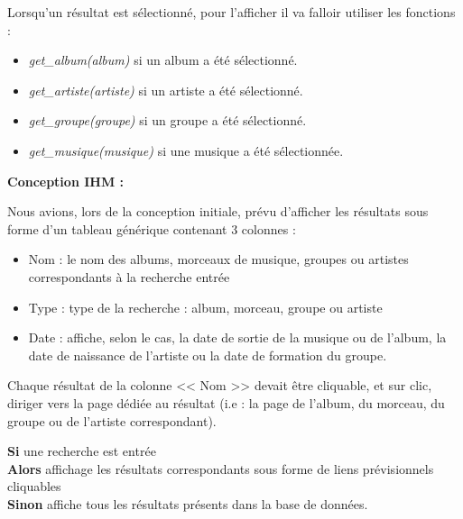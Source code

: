             \begin{paragraphe}
                 Lorsqu'un résultat est sélectionné, pour l'afficher il va falloir utiliser les fonctions :
                \begin{itemize}
                    \item \emph{get\_album(album)} si un album a été sélectionné.
                    \item \emph{get\_artiste(artiste)} si un artiste a été sélectionné.
                    \item \emph{get\_groupe(groupe)} si un groupe a été sélectionné.
                    \item \emph{get\_musique(musique)} si une musique a été sélectionnée.
                \end{itemize}
            \end{paragraphe}

			\begin{paragraphe}
				\textbf{Conception IHM :}
			\end{paragraphe}

			\begin{paragraphe}
			    Nous avions, lors de la conception initiale, prévu d'afficher les résultats sous forme d'un tableau générique contenant 3 colonnes :
				\begin{itemize}
					\item Nom : le nom des albums, morceaux de musique, groupes ou artistes correspondants à la recherche entrée
					\item Type : type de la recherche : album, morceau, groupe ou artiste
					\item Date : affiche, selon le cas, la date de sortie de la musique ou de l'album, la date de naissance de l'artiste ou la date de formation du groupe.
				\end{itemize}
				Chaque résultat de la colonne << Nom >> devait être cliquable, et sur clic, diriger vers la page dédiée au résultat (i.e : la page de l'album, du morceau, du groupe ou de l'artiste correspondant).
			\end{paragraphe}
            

            \begin{paragraphe}
                \textbf{Si} une recherche est entrée\\
                \textbf{Alors} affichage les résultats correspondants sous forme de liens prévisionnels cliquables\\
                \textbf{Sinon} affiche tous les résultats présents dans la base de données.
            \end{paragraphe}


